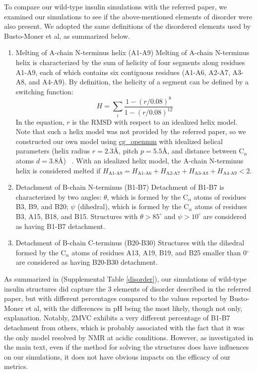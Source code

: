 \documentclass[9pt]{elife}
\begin{document}
To compare our wild-type insulin simulations with the referred paper, we examined our simulations to see if the above-mentioned elements of disorder were also present. We adopted the same definitions of the disordered elements used by Busto-Moner et al, as summarized below. 
\begin{enumerate}[label={(\arabic*)}]
\item Melting of A-chain N-terminus helix (A1-A9)
\newline
Melting of A-chain N-terminus helix is characterized by the sum of helicity of four segments along residues A1-A9, each of which contains six contiguous residues (A1-A6, A2-A7, A3-A8, and A4-A9). By definition, the helicity of a segment can be defined by a switching function:
\begin{equation}
    H = \sum_{i} \frac{1-(r/0.08)^8}{1-(r/0.08)^{12}}
\end{equation}
In the equation, $r$ is the RMSD with respect to an idealized helix model. Note that such a helix model was not provided by the referred paper, so we constructed our own model using \href{https://github.com/shirtsgroup/cg_openmm}{cg\_openmm} with idealized helical parameters (helix radius $r=2.3$\AA, pitch $p=5.5$\AA, and distance between C$_\alpha$ atoms $d=3.8$\AA) ~\cite{guo2013description, tozzini2010minimalist}. With an idealized helix model, the A-chain N-terminus helix is considered melted if $H_{\text{A1-A9}}=H_{\text{A1-A6}}+H_{\text{A2-A7}}+H_{\text{A3-A8}}+H_{\text{A4-A9}}<2$.

\item Detachment of B-chain N-terminus (B1-B7)
\newline
Detachment of B1-B7 is characterized by two angles: $\theta$, which is formed by the C$_\alpha$ atoms of residues B3, B9, and B20; $\psi$ (dihedral), which is formed by the C$_\alpha$ atoms of residues B3, A15, B18, and B15. Structures with $\theta>85^{\circ}$ and $\psi>10^{\circ}$ are considered as having B1-B7 detachment.

\item Detachment of B-chain C-terminus (B20-B30)
\newline
Structures with the dihedral formed by the C$_\alpha$ atoms of residues A13, A19, B19, and B25 smaller than 0$^{\circ}$ are considered as having B20-B30 detachment.
\end{enumerate}

As summarized in (Supplemental Table \ref{disorder}), our simulations of wild-type insulin structures did capture the 3 elements of disorder described in the referred paper, but with different percentages compared to the values reported by Busto-Moner et al, with the differences in pH being the most likely, though not only, explanation. Notably, 2MVC exhibits a very different percentage of B1-B7 detachment from others, which is probably associated with the fact that it was the only model resolved by NMR at acidic conditions. However, as investigated in the main text, even if the method for solving the structures does have influences on our simulations, it does not have obvious impacts on the efficacy of our metrics. 
\end{document}
